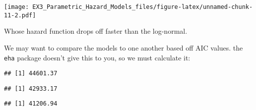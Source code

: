 \documentclass[
]{article}
\newenvironment{Shaded}{\begin{snugshade}}{\end{snugshade}}
\newcommand{\DecValTok}[1]{\textcolor[rgb]{0.00,0.00,0.81}{#1}}
\newcommand{\FloatTok}[1]{\textcolor[rgb]{0.00,0.00,0.81}{#1}}
\newcommand{\KeywordTok}[1]{\textcolor[rgb]{0.13,0.29,0.53}{\textbf{#1}}}
\newcommand{\NormalTok}[1]{#1}
\newcommand{\OperatorTok}[1]{\textcolor[rgb]{0.81,0.36,0.00}{\textbf{#1}}}
\begin{document}
\texttt{[image: EX3\_Parametric\_Hazard\_Models\_files/figure-latex/unnamed-chunk-11-2.pdf]}

Whose hazard function drops off faster than the log-normal.

We may want to compare the models to one another based off AIC values.
the \texttt{eha} package doesn't give this to you, so we must calculate
it:

\begin{Shaded}
\end{Shaded}

\begin{verbatim}
## [1] 44601.37
\end{verbatim}

\begin{Shaded}
\end{Shaded}

\begin{verbatim}
## [1] 42933.17
\end{verbatim}

\begin{Shaded}
\end{Shaded}

\begin{verbatim}
## [1] 41206.94
\end{verbatim}
\end{document}
